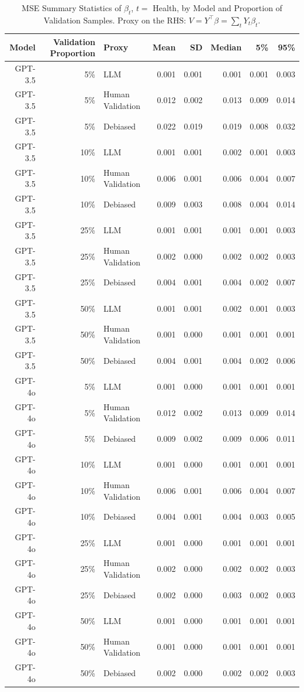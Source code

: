 \begin{table}

\caption{\label{tab:unnamed-chunk-1}MSE Summary Statistics of $\beta_{t}$, $t=$ Health, by Model and Proportion of Validation Samples.
      Proxy on the RHS: $V = Y^\top \beta = \sum_{t} Y_t \beta_t$.}
\centering
\begin{tabular}[t]{rrlrrrrr}
\toprule
Model & Validation Proportion & Proxy & Mean & SD & Median & 5\% & 95\%\\
\midrule
GPT-3.5 & 5\% & LLM & 0.001 & 0.001 & 0.001 & 0.001 & 0.003\\
GPT-3.5 & 5\% & Human Validation & 0.012 & 0.002 & 0.013 & 0.009 & 0.014\\
GPT-3.5 & 5\% & Debiased & 0.022 & 0.019 & 0.019 & 0.008 & 0.032\\
GPT-3.5 & 10\% & LLM & 0.001 & 0.001 & 0.002 & 0.001 & 0.003\\
GPT-3.5 & 10\% & Human Validation & 0.006 & 0.001 & 0.006 & 0.004 & 0.007\\
GPT-3.5 & 10\% & Debiased & 0.009 & 0.003 & 0.008 & 0.004 & 0.014\\
GPT-3.5 & 25\% & LLM & 0.001 & 0.001 & 0.001 & 0.001 & 0.003\\
GPT-3.5 & 25\% & Human Validation & 0.002 & 0.000 & 0.002 & 0.002 & 0.003\\
GPT-3.5 & 25\% & Debiased & 0.004 & 0.001 & 0.004 & 0.002 & 0.007\\
GPT-3.5 & 50\% & LLM & 0.001 & 0.001 & 0.002 & 0.001 & 0.003\\
GPT-3.5 & 50\% & Human Validation & 0.001 & 0.000 & 0.001 & 0.001 & 0.001\\
GPT-3.5 & 50\% & Debiased & 0.004 & 0.001 & 0.004 & 0.002 & 0.006\\
GPT-4o & 5\% & LLM & 0.001 & 0.000 & 0.001 & 0.001 & 0.001\\
GPT-4o & 5\% & Human Validation & 0.012 & 0.002 & 0.013 & 0.009 & 0.014\\
GPT-4o & 5\% & Debiased & 0.009 & 0.002 & 0.009 & 0.006 & 0.011\\
GPT-4o & 10\% & LLM & 0.001 & 0.000 & 0.001 & 0.001 & 0.001\\
GPT-4o & 10\% & Human Validation & 0.006 & 0.001 & 0.006 & 0.004 & 0.007\\
GPT-4o & 10\% & Debiased & 0.004 & 0.001 & 0.004 & 0.003 & 0.005\\
GPT-4o & 25\% & LLM & 0.001 & 0.000 & 0.001 & 0.001 & 0.001\\
GPT-4o & 25\% & Human Validation & 0.002 & 0.000 & 0.002 & 0.002 & 0.003\\
GPT-4o & 25\% & Debiased & 0.002 & 0.000 & 0.003 & 0.002 & 0.003\\
GPT-4o & 50\% & LLM & 0.001 & 0.000 & 0.001 & 0.001 & 0.001\\
GPT-4o & 50\% & Human Validation & 0.001 & 0.000 & 0.001 & 0.001 & 0.001\\
GPT-4o & 50\% & Debiased & 0.002 & 0.000 & 0.002 & 0.002 & 0.003\\
\bottomrule
\end{tabular}
\end{table}
